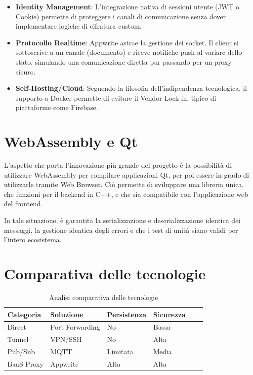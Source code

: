 \documentclass[a4paper, 11pt, twoside]{report}
\begin{document}
\begin{itemize}
\item\textbf{Identity Management}: L'integrazione nativa di sessioni utente (\gls{JWT} o Cookie) permette di proteggere i
    canali di comunicazione senza dover implementare logiche di cifratura custom.

\item\textbf{Protocollo Realtime}: Appwrite astrae la gestione dei socket. Il client si sottoscrive a un canale
    (documento) e riceve notifiche push al variare dello stato, simulando una comunicazione diretta pur passando per
    un proxy sicuro.

\item\textbf{Self-Hosting/Cloud}: Seguendo la filosofia dell'indipendenza tecnologica, il supporto a Docker permette di
    evitare il Vendor Lock-in, tipico di piattaforme come Firebase.

\end{itemize}

\section{WebAssembly e Qt}

L'aspetto che porta l'innovazione più grande del progetto è la possibilità di utilizzare WebAssembly per compilare
applicazioni Qt, per poi essere in grado di utilizzarle tramite Web Browser. Ciò permette di sviluppare una libreria
unica, che funzioni per il backend in C++, e che sia compatibile con l'applicazione web del frontend.

In tale situazione, è garantita la serializzazione e deserializzazione identica dei messaggi, la gestione identica degli
errori e che i test di unità siano validi per l'intero ecosistema.

\section{Comparativa delle tecnologie}

\begin{table}[h]
\centering
\begin{tabular}{@{}lp{4cm}lp{4cm}ll@{}}
\toprule
\textbf{Categoria} & \textbf{Soluzione} & \textbf{Persistenza} & \textbf{Sicurezza} \\ \midrule
Direct             & Port Forwarding    & No                   & Bassa              \\
Tunnel             & VPN/SSH            & No                   & Alta               \\
Pub/Sub            & \gls{MQTT}         & Limitata             & Media              \\
BaaS Proxy         & Appwrite           & Alta                 & Alta               \\
\bottomrule
\end{tabular}
\caption{Analisi comparativa delle tecnologie}
\end{table}
\end{document}
